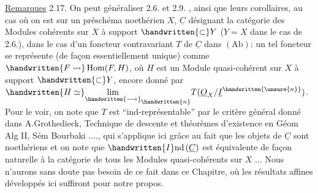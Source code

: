 \uline{Remarques} 2.17. On peut généraliser 2.6. et 2.9. , ainsi que leurs
corollaires, au cas où on est sur un préschéma noethérien $X$, $\underline C$ désignant
la catégorie des Modules cohérents sur $X$ à support $\handwritten{\subset}Y$ ($Y=X$ dans le
cas  de 2.6.), dans le cas d'un foncteur contravariant  $T$ de $\underline C$ dans $(\mathrm{Ab})$:
un tel foncteur  se représente (de façon essentiellement unique) comme $\handwritten{F\leadsto}\operatorname{Hom}(F,H)$, où $H$ est un Module quasi-cohérent sur
$X$ à support $\handwritten{\subset}Y$, %
encore donné par $\handwritten{H\simeq}\underset{\handwritten{\longrightarrow}}{\lim}_{\handwritten{n}}T(\underline O_X/\underline I^{\handwritten{\unsure{n}}})$. Pour le voir, on note
que $T$ est ``ind-représentable'' par le critère général donné dans A.Grothedieck, Technique de descente et théorèmes d'existence en Géom Alg II,
Sém Bourbaki ...., \handwritten{(}qui s'applique ici grâce au fait que les objets de
$\underline C$ sont noethériens\handwritten{),} et on note que $\handwritten{I}\mathrm{nd}\,(\underline C)$ est équivalente de façon naturelle à la catégorie de tous les Modules quasi-cohérents sur $X$ ... Nous
n'aurons sans doute pas besoin de ce fait dans ce Chapitre, où les résultats affines développés ici suffiront pour notre propos.

